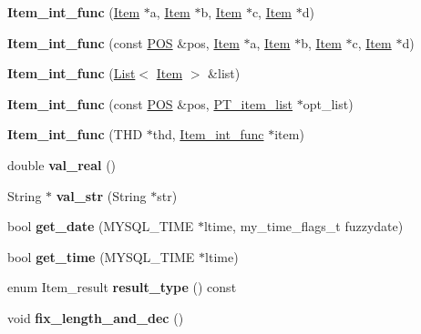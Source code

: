 \begin{DoxyCompactItemize}
\mbox{\label{classItem__int__func_ac719ba875ca650dff97d6de02df4f40a}} 
{\bfseries Item\+\_\+int\+\_\+func} (\mbox{\hyperlink{classItem}{Item}} $\ast$a, \mbox{\hyperlink{classItem}{Item}} $\ast$b, \mbox{\hyperlink{classItem}{Item}} $\ast$c, \mbox{\hyperlink{classItem}{Item}} $\ast$d)
\item 
\mbox{\label{classItem__int__func_ac39e8a323577b399a308aae6153c7833}} 
{\bfseries Item\+\_\+int\+\_\+func} (const \mbox{\hyperlink{structYYLTYPE}{P\+OS}} \&pos, \mbox{\hyperlink{classItem}{Item}} $\ast$a, \mbox{\hyperlink{classItem}{Item}} $\ast$b, \mbox{\hyperlink{classItem}{Item}} $\ast$c, \mbox{\hyperlink{classItem}{Item}} $\ast$d)
\item 
\mbox{\label{classItem__int__func_a40e921fb3d5e416076ba087578d247ae}} 
{\bfseries Item\+\_\+int\+\_\+func} (\mbox{\hyperlink{classList}{List}}$<$ \mbox{\hyperlink{classItem}{Item}} $>$ \&list)
\item 
\mbox{\label{classItem__int__func_a6abd2bf27d1dbb07569feeaccfb13114}} 
{\bfseries Item\+\_\+int\+\_\+func} (const \mbox{\hyperlink{structYYLTYPE}{P\+OS}} \&pos, \mbox{\hyperlink{classPT__item__list}{P\+T\+\_\+item\+\_\+list}} $\ast$opt\+\_\+list)
\item 
\mbox{\label{classItem__int__func_acb362143ecc2379427958d9163860d49}} 
{\bfseries Item\+\_\+int\+\_\+func} (T\+HD $\ast$thd, \mbox{\hyperlink{classItem__int__func}{Item\+\_\+int\+\_\+func}} $\ast$item)
\item 
\mbox{\label{classItem__int__func_a35052066f3aa625e34a0a41ca5a37771}} 
double {\bfseries val\+\_\+real} ()
\item 
\mbox{\label{classItem__int__func_afc0573853d7a24a7b2c5058df3fa8930}} 
String $\ast$ {\bfseries val\+\_\+str} (String $\ast$str)
\item 
\mbox{\label{classItem__int__func_a55510538a8a4f3c06c47300237b075ee}} 
bool {\bfseries get\+\_\+date} (M\+Y\+S\+Q\+L\+\_\+\+T\+I\+ME $\ast$ltime, my\+\_\+time\+\_\+flags\+\_\+t fuzzydate)
\item 
\mbox{\label{classItem__int__func_a100ee7f2ec6e28c0e6f566b205a19fdd}} 
bool {\bfseries get\+\_\+time} (M\+Y\+S\+Q\+L\+\_\+\+T\+I\+ME $\ast$ltime)
\item 
\mbox{\label{classItem__int__func_a7bfdbb62425f5f45c7b7e5b6f41b1ea1}} 
enum Item\+\_\+result {\bfseries result\+\_\+type} () const
\item 
\mbox{\label{classItem__int__func_a60ffb3697bc83cbcb28d980939aa4a2c}} 
void {\bfseries fix\+\_\+length\+\_\+and\+\_\+dec} ()
\end{DoxyCompactItemize}
